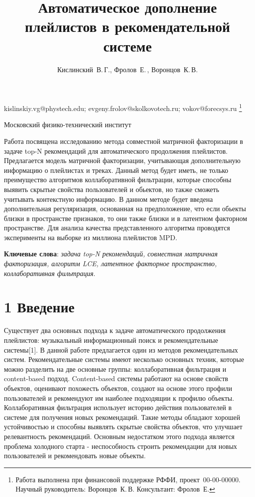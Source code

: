 \documentclass[12pt,twoside]{article}
\begin{document}
\title
    {Автоматическое дополнение плейлистов в рекомендательной системе}
\author
    {Кислинский~В.\,Г., Фролов~Е.\,, Воронцов~К.\,В.} %
\email
    {kislinskiy.vg@phystech.edu; evgeny.frolov@skolkovotech.ru; vokov@forecsys.ru}
\thanks
    {Работа выполнена при финансовой поддержке РФФИ, проект \No\,00-00-00000.
     Научный руководитель:  Воронцов~К.\,В.
     Консультант:  Фролов~Е.}

\organization
    {Московский физико-технический институт}
\abstract
	{Работа посвящена исследованию метода совместной матричной факторизации в задаче top-N рекомендаций для автоматического продолжения плейлистов. Предлагается  модель матричной факторизации, учитывающая дополнительную информацию о плейлистах и треках. Данный метод будет иметь, не только преимущество алгоритмов коллаборативной фильтрации, которые способны выявить скрытые свойства пользователей и обьектов,  но также сможеть учитывать контекстную информацию. В данном методе будет введена дополнительная регуляризация, основанная на предположение, что если обьекты близки в пространстве признаков, то они также близки и в латентном факторном пространстве. Для анализа качества представленного алгоритма проводятся эксперименты на выборке  из миллиона плейлистов MPD. 

\bigskip
\textbf{Ключевые слова}: \emph {задача top-N рекомендаций, совместная матричная факторизация, алгоритм LCE, латентное факторное пространство, коллаборативная фильтрация}.

}

\maketitle

\section{1 Введение}

Существует два основных подхода к задаче автоматического продолжения плейлистов: музыкальный информационный поиск и рекомендательные системы[1]. В данной работе предлагается один из методов рекомендательных систем. Рекомендательные системы имеют несколько основных техник, которые можно разделить на две основные группы: коллаборативная фильтрация и content-based подход. Content-based системы работают на основе свойств объектов, оценивают похожесть объектов, создают на основе этого профили пользователей и рекомендуют им наиболее подходящии к профилю объекты. Коллаборативная фильтрация использует историю действия пользователей в системе для получения новых рекомендаций. Такие методы обладают хорошей устойчивостью и способны выявлять скрытые свойства объектов, что улучшает релевантность рекомендаций. Основным недостатком этого подхода является проблема холодного старта - неспособность строить рекомендации для новых пользователей и рекомендовать новые объекты. 
\end{document}
